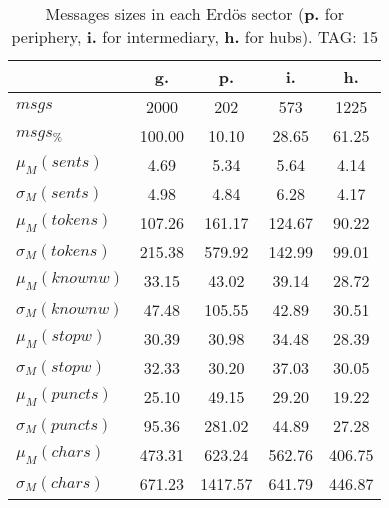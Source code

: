\begin{table}[h!]
\begin{center}
\begin{tabular}{| l || c | c | c | c |}\hline
 & {\bf g.} & {\bf p.} & {\bf i.} & {\bf h.} \\\hline\hline
$msgs$ & 2000  & 202  & 573  & 1225 \\
$msgs_{\%}$ & 100.00  & 10.10  & 28.65  & 61.25 \\\hline
$\mu_M(sents)$ & 4.69  & 5.34  & 5.64  & 4.14 \\
$\sigma_M(sents)$ & 4.98  & 4.84  & 6.28  & 4.17 \\\hline
$\mu_M(tokens)$ & 107.26  & 161.17  & 124.67  & 90.22 \\
$\sigma_M(tokens)$ & 215.38  & 579.92  & 142.99  & 99.01 \\\hline
$\mu_M(knownw)$ & 33.15  & 43.02  & 39.14  & 28.72 \\
$\sigma_M(knownw)$ & 47.48  & 105.55  & 42.89  & 30.51 \\\hline
$\mu_M(stopw)$ & 30.39  & 30.98  & 34.48  & 28.39 \\
$\sigma_M(stopw)$ & 32.33  & 30.20  & 37.03  & 30.05 \\\hline
$\mu_M(puncts)$ & 25.10  & 49.15  & 29.20  & 19.22 \\
$\sigma_M(puncts)$ & 95.36  & 281.02  & 44.89  & 27.28 \\\hline
$\mu_M(chars)$ & 473.31  & 623.24  & 562.76  & 406.75 \\
$\sigma_M(chars)$ & 671.23  & 1417.57  & 641.79  & 446.87 \\\hline
\end{tabular}
\caption{Messages sizes in each Erd\"os sector ({{\bf p.}} for periphery, {{\bf i.}} for intermediary, {{\bf h.}} for hubs). TAG: 15}
\end{center}
\end{table}